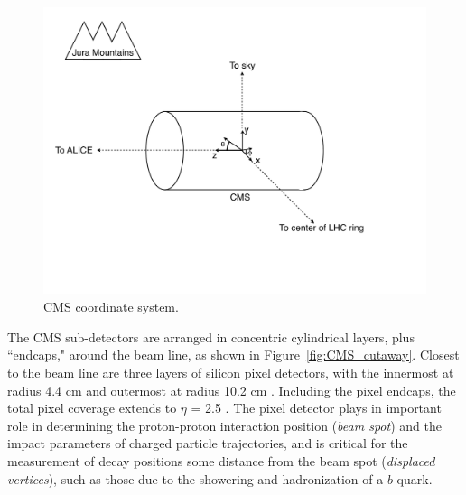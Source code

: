 \documentclass[dissertation.tex]{subfiles}
\begin{document}
\begin{figure}
	\centering
	\includegraphics[scale=0.5]{CMS_coordinate_system}
	\caption{CMS coordinate system.}
	\label{fig:CMS_coordinate_system}
\end{figure}

The CMS sub-detectors are arranged in concentric cylindrical layers, plus ``endcaps," around the beam line, as shown in Figure~\ref{fig:CMS_cutaway}.  Closest to the beam line are three layers of silicon pixel detectors, with the innermost at radius 4.4 cm and outermost at radius 10.2 cm \cite{CMS_detector_paper}.  Including the pixel endcaps, the total pixel coverage extends to $\eta$ = 2.5 \cite{CMS_detector_paper}.  The pixel detector plays in important role in determining the proton-proton interaction position (\textit{beam spot}) and the impact parameters of charged particle trajectories, and is critical for the measurement of decay positions some distance from the beam spot (\textit{displaced vertices}), such as those due to the showering and hadronization of a $b$ quark.
\end{document}
